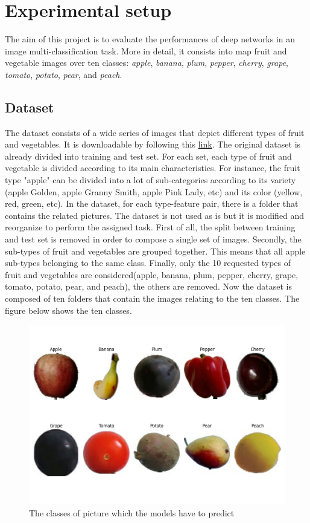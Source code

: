 \section{Experimental setup}\label{header-n31}

The aim of this project is to evaluate the performances of deep networks
in an image multi-classification task. More in detail, it consists into
map fruit and vegetable images over ten classes: \emph{apple},
\emph{banana}, \emph{plum}, \emph{pepper}, \emph{cherry}, \emph{grape},
\emph{tomato}, \emph{potato}, \emph{pear}, and \emph{peach}.

\subsection{Dataset}\label{header-n33}

The dataset consists of a wide series of images that depict different
types of fruit and vegetables. It is downloadable by following this
\href{https://www.kaggle.com/moltean/fruits}{link}. The original dataset
is already divided into training and test set. For each set, each type
of fruit and vegetable is divided according to its main characteristics.
For instance, the fruit type "apple" can be divided into a lot of
sub-categories according to its variety (apple Golden, apple Granny
Smith, apple Pink Lady, etc) and its color (yellow, red, green, etc). In
the dataset, for each type-feature pair, there is a folder that contains
the related pictures. The dataset is not used as is but it is modified
and reorganize to perform the assigned task. First of all, the split
between training and test set is removed in order to compose a single
set of images. Secondly, the sub-types of fruit and vegetables are
grouped together. This means that all apple sub-types belonging to the
same class. Finally, only the 10 requested types of fruit and vegetables
are considered(apple, banana, plum, pepper, cherry, grape, tomato,
potato, pear, and peach), the others are removed. Now the dataset is
composed of ten folders that contain the images relating to the ten
classes. The figure below shows the ten classes.

\begin{figure}[h!]
\centering
\includegraphics[width=0.9\linewidth]{../images/fruit-categories.png}
\caption{The classes of picture which the models have to predict}
\end{figure}

